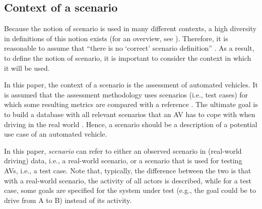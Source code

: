 \subsection{Context of a scenario}
\label{sec:context}

Because the notion of scenario is used in many different contexts, a high diversity in definitions of this notion exists (for an overview, see \cite{vannotten2003updated, bishop2007scentechniques}). Therefore, it is reasonable to assume that ``there is no `correct' scenario definition'' \cite{vannotten2003updated}. As a result, to define the notion of scenario, it is important to consider the context in which it will be used.

In this paper, the context of a scenario is the assessment of automated vehicles. It is assumed that the assessment methodology uses scenarios (i.e., test cases) for which some resulting metrics are compared with a reference \cite{stellet2015taxonomy}. 
The ultimate goal is to build a database with all relevant scenarios that an AV has to cope with when driving in the real world \cite{putz2017pegasus}. Hence, a scenario should be a description of a potential use case of an automated vehicle. 

In this paper, \emph{scenario} can refer to either an observed scenario in (real-world driving) data, i.e., a real-world scenario, or a scenario that is used for testing AVs, i.e., a test case. Note that, typically, the difference between the two is that with a real-world scenario, the activity of all actors is described, while for a test case, some goals are specified for the system under test (e.g., the goal could be to drive from A to B) instead of its activity. 

